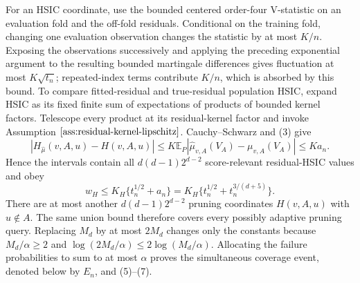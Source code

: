 For an HSIC coordinate, use the bounded centered order-four V-statistic on an evaluation fold and the off-fold residuals. Conditional on the training fold, changing one evaluation observation changes the statistic by at most \(K/n\). Exposing the observations successively and applying the preceding exponential argument to the resulting bounded martingale differences gives fluctuation at most \(K\sqrt{t_n}\); repeated-index terms contribute \(K/n\), which is absorbed by this bound. To compare fitted-residual and true-residual population HSIC, expand HSIC as its fixed finite sum of expectations of products of bounded kernel factors. Telescope every product at its residual-kernel factor and invoke Assumption \(\ref{ass:residual-kernel-lipschitz}\). Cauchy--Schwarz and (3) give
\[
\left|H_{\widehat\mu}(v,A,u)-H(v,A,u)\right|
\le K\mathbb E_P\left|\widehat\mu_{v,A}(V_A)-\mu_{v,A}(V_A)\right|
\le Ka_n. \tag{6}
\]
Hence the intervals contain all \(d(d-1)2^{d-2}\) score-relevant residual-HSIC values and obey
\[
w_H\le K_H\{t_n^{1/2}+a_n\}
=K_H\{t_n^{1/2}+t_n^{3/(d+5)}\}. \tag{7}
\]
There are at most another \(d(d-1)2^{d-2}\) pruning coordinates \(H(v,A,u)\) with \(u\notin A\). The same union bound therefore covers every possibly adaptive pruning query. Replacing \(M_d\) by at most \(2M_d\) changes only the constants because \(M_d/\alpha\ge2\) and \(\log(2M_d/\alpha)\le2\log(M_d/\alpha)\). Allocating the failure probabilities to sum to at most \(\alpha\) proves the simultaneous coverage event, denoted below by \(E_n\), and (5)--(7).

